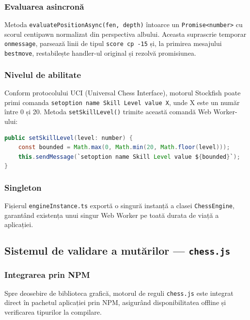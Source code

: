 \documentclass[12pt,a4paper]{article}
\begin{document}
\subsubsection{Evaluarea asincronă}

Metoda \texttt{evaluatePositionAsync(fen, depth)} întoarce un \texttt{Promise<number>} cu scorul centipawn normalizat din perspectiva albului. Aceasta suprascrie temporar \texttt{onmessage}, parsează linii de tipul \texttt{score cp -15} și, la primirea mesajului \texttt{bestmove}, restabilește handler-ul original și rezolvă promisiunea.

\subsubsection{Nivelul de abilitate}

Conform protocolului UCI (Universal Chess Interface), motorul Stockfish poate primi comanda \texttt{setoption name Skill Level value X}, unde X este un număr între 0 și 20. Metoda \texttt{setSkillLevel()} trimite această comandă Web Worker-ului:

\nopagebreak
\begin{lstlisting}[language=Java, caption={Setarea nivelului de abilitate conform UCI}]
public setSkillLevel(level: number) {
    const bounded = Math.max(0, Math.min(20, Math.floor(level)));
    this.sendMessage(`setoption name Skill Level value ${bounded}`);
}
\end{lstlisting}
\nopagebreak

\subsubsection{Singleton}

Fișierul \texttt{engineInstance.ts} exportă o singură instanță a clasei \texttt{ChessEngine}, garantând existența unui singur Web Worker pe toată durata de viață a aplicației.

\subsection{Sistemul de validare a mutărilor — \texttt{chess.js}}

\subsubsection{Integrarea prin NPM}

Spre deosebire de biblioteca grafică, motorul de reguli \texttt{chess.js} este integrat direct în pachetul aplicației prin NPM, asigurând disponibilitatea offline și verificarea tipurilor la compilare.
\end{document}
